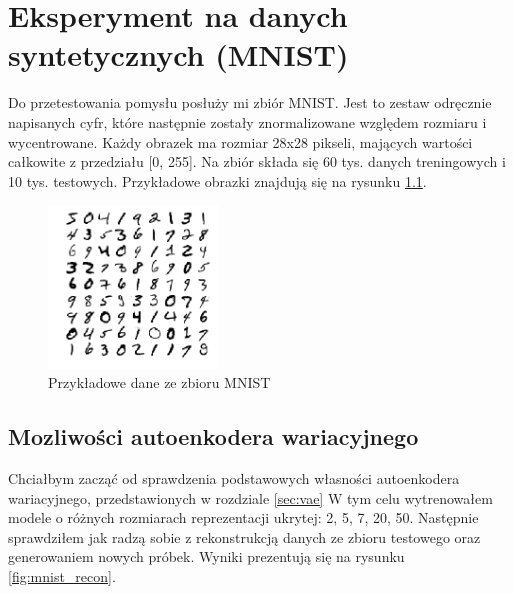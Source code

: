 \chapter{Eksperyment na danych syntetycznych (MNIST)}

Do przetestowania pomysłu posłuży mi zbiór MNIST. Jest to zestaw odręcznie napisanych cyfr, które następnie zostały znormalizowane względem rozmiaru i wycentrowane. Każdy obrazek ma rozmiar 28x28 pikseli, mających wartości całkowite z przedziału [0, 255]. Na zbiór składa się 60 tys. danych treningowych i 10 tys. testowych. Przykładowe obrazki znajdują się na rysunku \ref{fig:mnist}.

\begin{figure}[h!]
    \centering
    \includegraphics[width=0.4\textwidth]{images/mnist_v2}
    \caption{Przykładowe dane ze zbioru MNIST}
    \label{fig:mnist}
\end{figure}

\section{Mozliwości autoenkodera wariacyjnego} \label{sec:vae_oppo}

Chciałbym zacząć od sprawdzenia podstawowych własności autoenkodera wariacyjnego, przedstawionych w rozdziale \ref{sec:vae} W tym celu wytrenowałem modele o różnych rozmiarach reprezentacji ukrytej: 2, 5, 7, 20, 50. Następnie sprawdziłem jak radzą sobie z rekonstrukcją danych ze zbioru testowego oraz generowaniem nowych próbek. Wyniki prezentują się na rysunku \ref{fig:mnist_recon}. 

